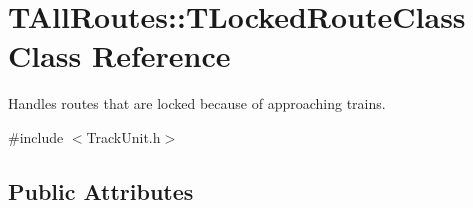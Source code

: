\hypertarget{class_t_all_routes_1_1_t_locked_route_class}{}\section{T\+All\+Routes\+:\+:T\+Locked\+Route\+Class Class Reference}
\label{class_t_all_routes_1_1_t_locked_route_class}


Handles routes that are locked because of approaching trains.  




{\ttfamily \#include $<$Track\+Unit.\+h$>$}

\subsection*{Public Attributes}
